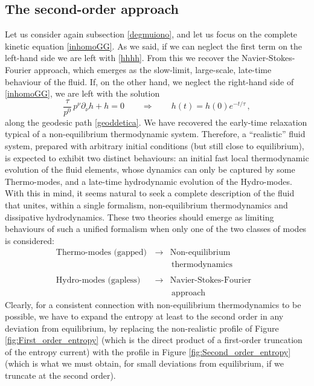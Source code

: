 \documentclass[a4paper, amsfonts, amssymb, amsmath, reprint, twocolumn, showkeys, nofootinbib]{revtex4-2}
\begin{document}
\subsection{The second-order approach}

Let us consider again subsection \ref{degmuiono}, and let us focus on the complete kinetic equation \eqref{inhomoGG}. As we said, if we can neglect the first term on the left-hand side we are left with \eqref{hhhh}. From this we recover the Navier-Stokes-Fourier approach, which emerges as the slow-limit, large-scale, late-time behaviour of the fluid. If, on the other hand, we neglect the right-hand side of \eqref{inhomoGG}, we are left with the solution
\begin{equation}
\dfrac{\tau}{p^0} \,  p^\nu \partial_\nu h + h =0 
\qquad \Rightarrow \qquad
h(t) =h(0)e^{-t/\tau} \, ,
\end{equation}
along the geodesic path \eqref{geoddetica}. We have recovered the early-time relaxation typical of a non-equilibrium thermodynamic system. Therefore, a ``realistic'' fluid system, prepared with arbitrary initial conditions (but still close to equilibrium), is expected to exhibit two distinct behaviours: an initial fast local thermodynamic evolution of the fluid elements, whose dynamics can only be captured by some Thermo-modes, and a late-time hydrodynamic evolution of the Hydro-modes. 
With this in mind, it seems natural to seek a complete description of the fluid that unites, within a single formalism, non-equilibrium thermodynamics and dissipative hydrodynamics. These two theories should emerge as limiting behaviours of such a unified formalism when only one of the two classes of modes is considered:
\begin{align*}
 \text{Thermo-modes (gapped)} \, & \rightarrow &\text{Non-equilibrium}   \quad  & \\ 
                                 & \,          & \, \text{thermodynamics}  \quad  &
  \\
   & & &
  \\
 \text{Hydro-modes (gapless)} \, & \rightarrow & \text{Navier-Stokes-Fourier} & \\ 
                                 & \,          & \, \text{approach}  \quad \quad \quad &
\end{align*}
Clearly, for a consistent connection with non-equilibrium thermodynamics to be possible, we have to expand the entropy at least to the second order in any deviation from equilibrium, by replacing the non-realistic profile of Figure \ref{fig:First_order_entropy} (which is the direct product of a first-order truncation of the entropy current) with the profile in  Figure \ref{fig:Second_order_entropy} (which is what we must obtain, for small deviations from equilibrium, if we truncate at the second order).
\end{document}
